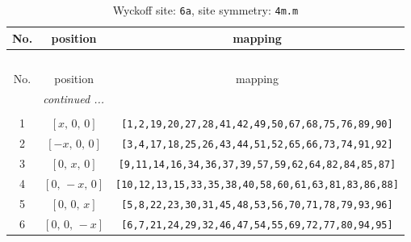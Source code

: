 \documentclass[fleqn,8pt]{jsarticle}
\begin{document}
\begin{longtable}{ccc}
\caption{Wyckoff site: {\tt 6a}, site symmetry: {\tt 4m.m}}
 \\
 \hline \hline
No. & position & mapping \\ \hline \endfirsthead

\multicolumn{2}{l}{\tablename\ \thetable{}} \\
 \hline \hline
No. & position & mapping \\ \hline \endhead

 \hline \hline
\multicolumn{2}{r}{\footnotesize\it continued ...} \\ \endfoot

 \hline \hline
\multicolumn{2}{r}{} \\ \endlastfoot

1 & $\left[ x,\, 0,\, 0 \right]$ & {\tt [1,2,19,20,27,28,41,42,49,50,67,68,75,76,89,90]} \\ \hline
2 & $\left[ - x,\, 0,\, 0 \right]$ & {\tt [3,4,17,18,25,26,43,44,51,52,65,66,73,74,91,92]} \\ \hline
3 & $\left[ 0,\, x,\, 0 \right]$ & {\tt [9,11,14,16,34,36,37,39,57,59,62,64,82,84,85,87]} \\ \hline
4 & $\left[ 0,\, - x,\, 0 \right]$ & {\tt [10,12,13,15,33,35,38,40,58,60,61,63,81,83,86,88]} \\ \hline
5 & $\left[ 0,\, 0,\, x \right]$ & {\tt [5,8,22,23,30,31,45,48,53,56,70,71,78,79,93,96]} \\ \hline
6 & $\left[ 0,\, 0,\, - x \right]$ & {\tt [6,7,21,24,29,32,46,47,54,55,69,72,77,80,94,95]} \\
\end{longtable}
\renewcommand{\arraystretch}{1.2}
\end{document}
